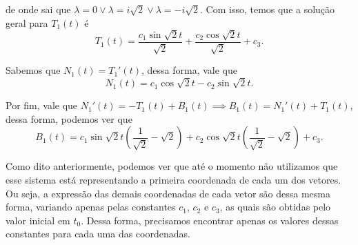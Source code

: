 \documentclass{article}
\begin{document}
\noindent de onde sai que $\lambda = 0\lor \lambda = i\sqrt{2}\lor \lambda = -i\sqrt{2}$. Com isso, temos que a solução geral para $T_1(t)$ é
\[T_1(t) = \dfrac{c_1 \sin{\sqrt{2}t}}{\sqrt{2}} + \dfrac{c_2 \cos{\sqrt{2}t}}{\sqrt{2}} + c_3.\]

Sabemos que $N_1(t) = T_1'(t)$, dessa forma, vale que
\[N_1(t) = c_1\cos{\sqrt{2}t} - c_2\sin{\sqrt{2}t}.\]

Por fim, vale que $N_1'(t) = -T_1(t) + B_1(t)\implies B_1(t) = N_1'(t) + T_1(t)$, dessa forma, podemos ver que
\[B_1(t) = c_1\sin{\sqrt{2}t}\left(\dfrac{1}{\sqrt{2}} - \sqrt{2}\right) + c_2\cos{\sqrt{2}t}\left(\dfrac{1}{\sqrt{2}} - \sqrt{2}\right) + c_3.\]

Como dito anteriormente, podemos ver que até o momento não utilizamos que esse sistema está representando a primeira coordenada de cada um dos vetores. Ou seja, a expressão das demais coordenadas de cada vetor são dessa mesma forma, variando apenas pelas constantes $c_1$, $c_2$ e $c_3$, as quais são obtidas pelo valor inicial em $t_0$. Dessa forma, precisamos encontrar apenas os valores dessas constantes para cada uma das coordenadas.
\end{document}
